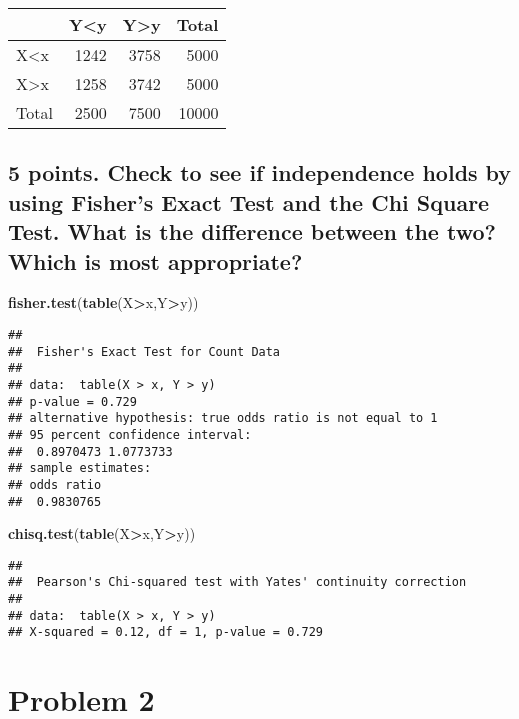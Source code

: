 \documentclass[]{article}
\newenvironment{Shaded}{\begin{snugshade}}{\end{snugshade}}
\newcommand{\KeywordTok}[1]{\textcolor[rgb]{0.13,0.29,0.53}{\textbf{#1}}}
\newcommand{\OperatorTok}[1]{\textcolor[rgb]{0.81,0.36,0.00}{\textbf{#1}}}
\newcommand{\NormalTok}[1]{#1}
\begin{document}
\begin{longtable}[]{@{}lrrr@{}}
\toprule
& Y\textless{}y & Y\textgreater{}y & Total\tabularnewline
\midrule
\endhead
X\textless{}x & 1242 & 3758 & 5000\tabularnewline
X\textgreater{}x & 1258 & 3742 & 5000\tabularnewline
Total & 2500 & 7500 & 10000\tabularnewline
\bottomrule
\end{longtable}

\subsection{5 points. Check to see if independence holds by using
Fisher's Exact Test and the Chi Square Test. What is the difference
between the two? Which is most
appropriate?}\label{points.-check-to-see-if-independence-holds-by-using-fishers-exact-test-and-the-chi-square-test.-what-is-the-difference-between-the-two-which-is-most-appropriate}

\begin{Shaded}
\begin{Highlighting}[]
\KeywordTok{fisher.test}\NormalTok{(}\KeywordTok{table}\NormalTok{(X}\OperatorTok{>}\NormalTok{x,Y}\OperatorTok{>}\NormalTok{y))}
\end{Highlighting}
\end{Shaded}

\begin{verbatim}
## 
##  Fisher's Exact Test for Count Data
## 
## data:  table(X > x, Y > y)
## p-value = 0.729
## alternative hypothesis: true odds ratio is not equal to 1
## 95 percent confidence interval:
##  0.8970473 1.0773733
## sample estimates:
## odds ratio 
##  0.9830765
\end{verbatim}

\begin{Shaded}
\begin{Highlighting}[]
\KeywordTok{chisq.test}\NormalTok{(}\KeywordTok{table}\NormalTok{(X}\OperatorTok{>}\NormalTok{x,Y}\OperatorTok{>}\NormalTok{y))}
\end{Highlighting}
\end{Shaded}

\begin{verbatim}
## 
##  Pearson's Chi-squared test with Yates' continuity correction
## 
## data:  table(X > x, Y > y)
## X-squared = 0.12, df = 1, p-value = 0.729
\end{verbatim}

\section{Problem 2}\label{problem-2}
\end{document}
